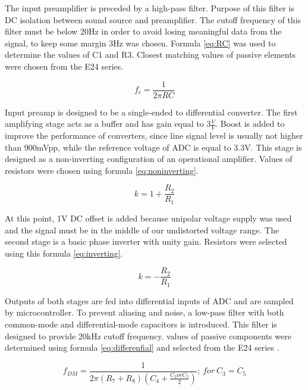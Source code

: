 \documentclass[a4paper,twoside,12pt]{book}
\begin{document}
The input preamplifier is preceded by a high-pass filter.
Purpose of this filter is DC isolation between sound source and preamplifier.
The cutoff frequency of this filter must be below 20Hz
in order to avoid losing meaningful data from the signal,
to keep some margin 3Hz was chosen.
Formula \ref{eq:RC} was used to determine the values of C1 and R3.
Closest matching values of passive elements were chosen from the E24 series.

\begin{equation}\label{eq:RC}
f_c = \frac{1}{2 \pi RC}
\end{equation}

Input preamp is designed to be a single-ended to differential converter.
The first amplifying stage acts as a buffer and has gain equal to \(3\frac{V}{V}\).
Boost is added to improve the performance of converters,
since line signal level is usually not higher than 900mVpp,
while the reference voltage of ADC is equal to 3.3V.
This stage is designed as a non-inverting configuration of an operational amplifier.
Values of resistors were chosen using formula \ref{eq:noninverting}.

\begin{equation}\label{eq:noninverting}
k = 1+\frac{R_2}{R_1}
\end{equation}

At this point, 1V DC offset is added because unipolar voltage supply was used
and the signal must be in the middle of our undistorted voltage range.
The second stage is a basic phase inverter with unity gain.
Resistors were selected using this formula \ref{eq:inverting}.

\begin{equation}\label{eq:inverting}
k = -\frac{R_2}{R_1}
\end{equation}

Outputs of both stages are fed into differential inputs of ADC
and are sampled by microcontroller.
To prevent aliasing and noise,
a low-pass filter with both common-mode and differential-mode capacitors
is introduced. This filter is designed to provide 20kHz cutoff frequency.
values of passive components were determined using formula \ref{eq:differenfial}
and selected from the E24 series
\cite{aliasing}.

\begin{equation}\label{eq:differenfial}
f_{DM} = \frac{1}{2 \pi (R_7 + R_8)(C_4 + \frac{C_3 or C_5}{2})};\ for \ C_3 = C_5
\end{equation}
\end{document}
